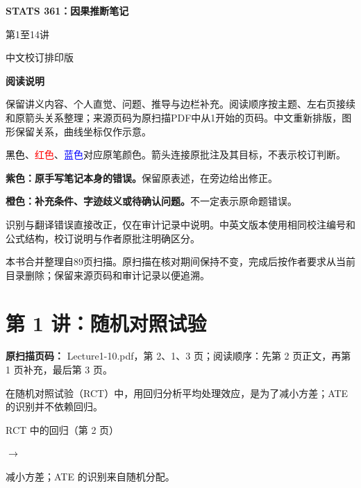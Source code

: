 \documentclass[11pt,a4paper]{article}
\newcommand{\sourcepages}[1]{\par{\small\sffamily\color{muted}\textbf{Scan reference:} #1\par}\nobreak\smallskip\nopagebreak[4]}
\newcommand{\inkblue}[1]{\textcolor{blue}{#1}}
\newcommand{\inkred}[1]{\textcolor{red}{#1}}
\newcommand{\notearrow}[3]{%
\par\Needspace{6\baselineskip}\smallskip
\noindent\begin{minipage}[c]{0.43\linewidth}\raggedright\color{#1}#2\end{minipage}%
\hfill\textcolor{#1}{\(\longrightarrow\)}\hfill%
\begin{minipage}[c]{0.43\linewidth}\raggedright#3\end{minipage}\par\smallskip}
\begin{document}
\def\ChineseEdition{1}
\renewcommand{\contentsname}{目录}

\renewcommand{\sourcepages}[1]{\par{\small\sffamily\color{muted}\textbf{原扫描页码：} #1\par}\nobreak\smallskip\nopagebreak[4]}
\begin{titlepage}\thispagestyle{empty}
\vspace*{14mm}{\small\sffamily MING的个人学习笔记\par}\vspace{10mm}
{\Huge\sffamily\bfseries STATS 361：因果推断笔记\par}\vspace{8mm}
{\LARGE\sffamily 第1至14讲\par}\vspace{10mm}
{\large 中文校订排印版\par}\vfill
\textbf{阅读说明}\par
保留讲义内容、个人直觉、问题、推导与边栏补充。阅读顺序按主题、左右页接续和原箭头关系整理；来源页码为原扫描PDF中从1开始的页码。中文重新排版，图形保留关系，曲线坐标仅作示意。\par
\textcolor{black}{黑色}、\inkred{红色}、\inkblue{蓝色}对应原笔颜色。箭头连接原批注及其目标，不表示校订判断。\par
\textcolor{ReviewPurple}{\textbf{紫色：原手写笔记本身的错误。}}保留原表述，在旁边给出修正。\par
\textcolor{ReviewOrange}{\textbf{橙色：补充条件、字迹歧义或待确认问题。}}不一定表示原命题错误。\par
识别与翻译错误直接改正，仅在审计记录中说明。中英文版本使用相同校注编号和公式结构，校订说明与作者原批注明确区分。\par
本书合并整理自89页扫描。原扫描在核对期间保持不变，完成后按作者要求从当前目录删除；保留来源页码和审计记录以便追溯。\par
\vspace{6mm}{\small 整理于2026年10月31日\par}
\end{titlepage}\tableofcontents\clearpage
{}
\section{第 1 讲：随机对照试验}
\sourcepages{Lecture1-10.pdf，第 2、1、3 页；阅读顺序：先第 2 页正文，再第 1 页补充，最后第 3 页。}
在随机对照试验（RCT）中，用回归分析平均处理效应，是为了减小方差；ATE 的识别并不依赖回归。
\notearrow{black}{RCT 中的回归（第 2 页）}{减小方差；ATE 的识别来自随机分配。}
\end{document}
